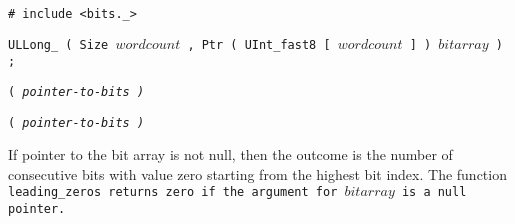 
\tt{# include <bits._>}

\tt{ULLong_} \s\tt{( Size} $wordcount$
\tt{, Ptr ( UInt_fast8 [} $wordcount$ \tt{] )} $bitarray$ \tt{) ;}

\s\tt{(}
\it{pointer-to-bits} \tt{)}

\s\s\tt{(}
\it{pointer-to-bits} \tt{)}


If pointer to the bit array is not null, then the outcome is the number
of consecutive bits with value zero starting from the highest bit index.
The function \tt{leading_zeros} returns zero if
the argument for $bitarray$ is a null pointer.

